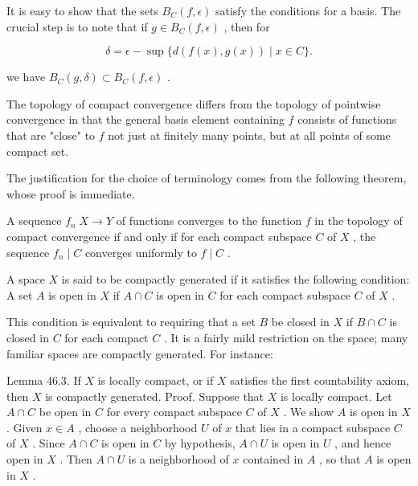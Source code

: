 It is easy to show that the sets \({B}_{C}\left( {f,\epsilon }\right)\) satisfy the conditions for a basis. The crucial step is to note that if \(g \in  {B}_{C}\left( {f,\epsilon }\right)\) , then for

\[
\delta  = \epsilon  - \sup \{ d\left( {f\left( x\right) ,g\left( x\right) }\right)  \mid  x \in  C\} .
\]

we have \({B}_{C}\left( {g,\delta }\right)  \subset  {B}_{C}\left( {f,\epsilon }\right)\) .

The topology of compact convergence differs from the topology of pointwise convergence in that the general basis element containing \(f\) consists of functions that are "close" to \(f\) not just at finitely many points, but at all points of some compact set.

The justification for the choice of terminology comes from the following theorem, whose proof is immediate.

\begin{theorem} A sequence \({f}_{n}\;X \rightarrow  Y\) of functions converges to the function \(f\) in the topology of compact convergence if and only if for each compact subspace \(C\) of \(X\) , the sequence \({f}_{n} \mid  C\) converges uniformly to \(f \mid  C\) .
\end{theorem}

\begin{definition} A space \(X\) is said to be compactly generated if it satisfies the following condition: A set \(A\) is open in \(X\) if \(A \cap  C\) is open in \(C\) for each compact subspace \(C\) of \(X\) .
\end{definition}

This condition is equivalent to requiring that a set \(B\) be closed in \(X\) if \(B \cap  C\) is closed in \(C\) for each compact \(C\) . It is a fairly mild restriction on the space; many familiar spaces are compactly generated. For instance:

Lemma 46.3. If \(X\) is locally compact, or if \(X\) satisfies the first countability axiom, then \(X\) is compactly generated. Proof. Suppose that \(X\) is locally compact. Let \(A \cap  C\) be open in \(C\) for every compact subspace \(C\) of \(X\) . We show \(A\) is open in \(X\) . Given \(x \in  A\) , choose a neighborhood \(U\) of \(x\) that lies in a compact subspace \(C\) of \(X\) . Since \(A \cap  C\) is open in \(C\) by hypothesis, \(A \cap  U\) is open in \(U\) , and hence open in \(X\) . Then \(A \cap  U\) is a neighborhood of \(x\) contained in \(A\) , so that \(A\) is open in \(X\) .

